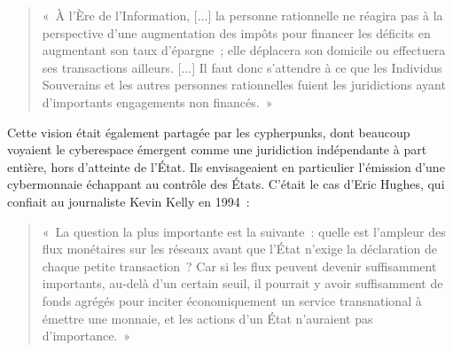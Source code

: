 \begin{quote}
«~À l'Ère de l'Information, [...] la personne rationnelle ne réagira pas à la perspective d'une augmentation des impôts pour financer les déficits en augmentant son taux d'épargne~; elle déplacera son domicile ou effectuera ses transactions ailleurs. [...] Il faut donc s'attendre à ce que les Individus Souverains et les autres personnes rationnelles fuient les juridictions ayant d'importants engagements non financés.~»
\end{quote} %

Cette vision était également partagée par les cypherpunks, dont beaucoup voyaient le cyberespace émergent comme une juridiction indépendante à part entière, hors d'atteinte de l'État. Ils envisageaient en particulier l'émission d'une cybermonnaie échappant au contrôle des États. C'était le cas d'Eric Hughes, qui confiait au journaliste Kevin Kelly en 1994~:

\begin{quote}
«~La question la plus importante est la suivante~: quelle est l'ampleur des flux monétaires sur les réseaux avant que l'État n'exige la déclaration de chaque petite transaction~? Car si les flux peuvent devenir suffisamment importants, au-delà d'un certain seuil, il pourrait y avoir suffisamment de fonds agrégés pour inciter économiquement un service transnational à émettre une monnaie, et les actions d'un État n'auraient pas d'importance.~»
\end{quote} %

